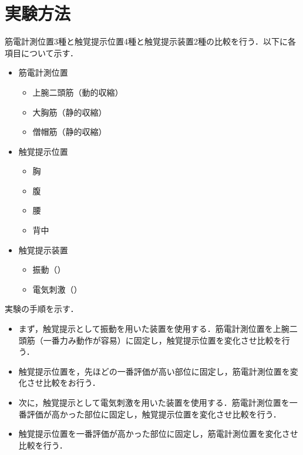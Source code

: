 \section{実験方法}
        筋電計測位置3種と触覚提示位置4種と触覚提示装置2種の比較を行う．以下に各項目について示す．

        \begin{itemize}
        \item 筋電計測位置
                \begin{itemize}
                \item 上腕二頭筋（動的収縮）
                \item 大胸筋（静的収縮）
                \item 僧帽筋（静的収縮）
                \end{itemize}
        \item 触覚提示位置
                \begin{itemize}
                \item 胸
                \item 腹
                \item 腰
                \item 背中
                \end{itemize}
        \item 触覚提示装置
                \begin{itemize}
                \item 振動（）
                \item 電気刺激（）
                \end{itemize}
        \end{itemize}

        実験の手順を示す．
        \begin{itemize}
        \item まず，触覚提示として振動を用いた装置を使用する．筋電計測位置を上腕二頭筋（一番力み動作が容易）に固定し，触覚提示位置を変化させ比較を行う．
        \item 触覚提示位置を，先ほどの一番評価が高い部位に固定し，筋電計測位置を変化させ比較をお行う．
        \item 次に，触覚提示として電気刺激を用いた装置を使用する．筋電計測位置を一番評価が高かった部位に固定し，触覚提示位置を変化させ比較を行う．
        \item 触覚提示位置を一番評価が高かった部位に固定し，筋電計測位置を変化させ比較を行う．
        \end{itemize}


